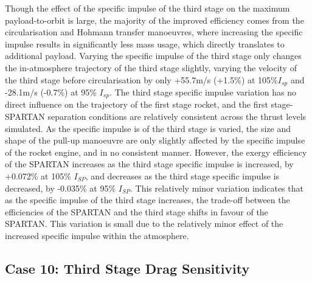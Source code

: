 Though the effect of the specific impulse of the third stage on the maximum payload-to-orbit is large, the majority of the improved efficiency comes from the circularisation and Hohmann transfer manoeuvres, where increasing the specific impulse results in significantly less mass usage, which directly translates to additional payload. Varying the specific impulse of the third stage only changes the in-atmosphere trajectory of the third stage slightly, varying the velocity of the third stage before circularisation by only +55.7m/s (+1.5\%) at 105\%$I_{sp}$ and -28.1m/s (-0.7\%) at 95\% $I_{sp}$. 
The third stage specific impulse variation has no direct influence on the trajectory of the first stage rocket, and the first stage-SPARTAN separation conditions are relatively consistent across the thrust levels simulated.
As the specific impulse is of the third stage is varied, the size and shape of the pull-up manoeuvre are only slightly affected by the specific impulse of the rocket engine, and in no consistent manner. 
 However, the exergy efficiency of the SPARTAN increases as the third stage specific impulse is increased, by +0.072\% at 105\% $I_{SP}$, and decreases as the third stage specific impulse is decreased, by -0.035\% at 95\% $I_{SP}$. This relatively minor variation indicates that as the specific impulse of the third stage increases, the trade-off between the efficiencies of the SPARTAN and the third stage shifts in favour of the SPARTAN. This variation is small due to the relatively minor effect of the increased specific impulse within the atmosphere. 


\subsection{Case 10: Third Stage Drag Sensitivity}

